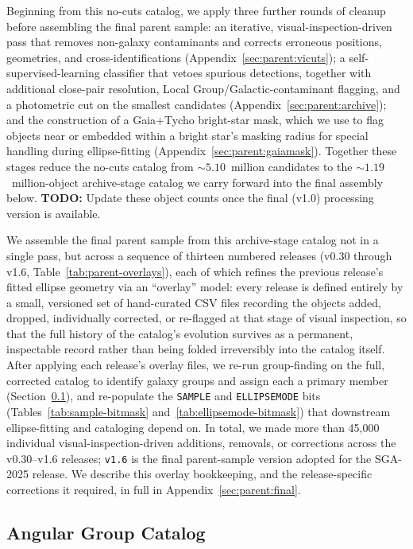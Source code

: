 \documentclass[modern,linenumbers]{aastex701}
\newcommand{\todo}[1]{{\color{red}\textbf{TODO:} #1}}
\begin{document}
Beginning from this no-cuts catalog, we apply three further rounds of
cleanup before assembling the final parent sample: an iterative,
visual-inspection-driven pass that removes non-galaxy contaminants and
corrects erroneous positions, geometries, and cross-identifications
(Appendix~\ref{sec:parent:vicuts}); a self-supervised-learning
classifier that vetoes spurious detections, together with additional
close-pair resolution, Local Group/Galactic-contaminant flagging, and a
photometric cut on the smallest candidates (Appendix~\ref{sec:parent:archive});
and the construction of a Gaia+Tycho bright-star mask, which we use to
flag objects near or embedded within a bright star's masking radius for
special handling during ellipse-fitting (Appendix~\ref{sec:parent:gaiamask}).
Together these stages reduce the no-cuts catalog from $\sim\!5.10$~million
candidates to the $\sim\!1.19$~million-object archive-stage catalog we
carry forward into the final assembly below. \todo{Update these object
  counts once the final (v1.0) processing version is available.}

We assemble the final parent sample from this archive-stage catalog not
in a single pass, but across a sequence of thirteen numbered releases
(v0.30 through v1.6, Table~\ref{tab:parent-overlays}), each of which
refines the previous release's fitted ellipse geometry via an
``overlay'' model: every release is defined entirely by a small,
versioned set of hand-curated CSV files recording the objects added,
dropped, individually corrected, or re-flagged at that stage of visual
inspection, so that the full history of the catalog's evolution
survives as a permanent, inspectable record rather than being folded
irreversibly into the catalog itself. After applying each release's
overlay files, we re-run group-finding on the full, corrected catalog to
identify galaxy groups and assign each a primary member
(Section~\ref{sec:parent:groups}), and re-populate the \texttt{SAMPLE}
and \texttt{ELLIPSEMODE} bits (Tables~\ref{tab:sample-bitmask}
and~\ref{tab:ellipsemode-bitmask}) that downstream ellipse-fitting and
cataloging depend on. In total, we made more than 45,000 individual
visual-inspection-driven additions, removals, or corrections across the
v0.30--v1.6 releases; \texttt{v1.6} is the final parent-sample version
adopted for the SGA-2025 release. We describe this overlay bookkeeping,
and the release-specific corrections it required, in full in
Appendix~\ref{sec:parent:final}.

\subsection{Angular Group Catalog}
\label{sec:parent:groups}
\end{document}
